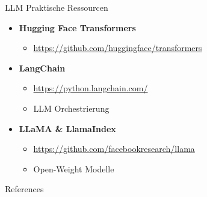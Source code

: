 \documentclass[aspectratio=1610, xcolor=dvipsnames, 9pt]{beamer}
\begin{document}
\begin{frame}{LLM Praktische Ressourcen}
\begin{itemize}
\item \textbf{Hugging Face Transformers}
\begin{itemize}
\item \url{https://github.com/huggingface/transformers}
\end{itemize}

\item \textbf{LangChain}
\begin{itemize}
\item \url{https://python.langchain.com/}
\item LLM Orchestrierung
\end{itemize}

\item \textbf{LLaMA \& LlamaIndex}
\begin{itemize}
\item \url{https://github.com/facebookresearch/llama}
\item Open-Weight Modelle
\end{itemize}
\end{itemize}
\end{frame}
\begin{frame}[allowframebreaks]{References}
 
 
\end{frame}
\end{document}
